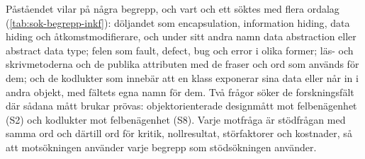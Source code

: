 Påståendet vilar på några begrepp, och vart och ett söktes med flera
ordalag (\cref{tab:sok-begrepp-inkf}): döljandet som
\foreignlanguage{english}{encapsulation}, \foreignlanguage{english}{information
hiding}, \foreignlanguage{english}{data hiding} och åtkomstmodifierare,
och under sitt andra namn \foreignlanguage{english}{data abstraction}
eller \foreignlanguage{english}{abstract data type}; felen som
\foreignlanguage{english}{fault}, \foreignlanguage{english}{defect},
\foreignlanguage{english}{bug} och \foreignlanguage{english}{error} i
olika former; läs- och skrivmetoderna och de publika attributen med de
fraser och ord som används för dem; och de kodlukter som innebär att en
klass exponerar sina data eller når in i andra objekt, med fältets egna
namn för dem.  Två frågor söker de forskningsfält där sådana mått brukar
prövas: objektorienterade designmått mot felbenägenhet (S2) och kodlukter
mot felbenägenhet (S8).  Varje motfråga är stödfrågan med samma ord och
därtill ord för kritik, nollresultat, störfaktorer och kostnader, så att
motsökningen använder varje begrepp som stödsökningen använder.

